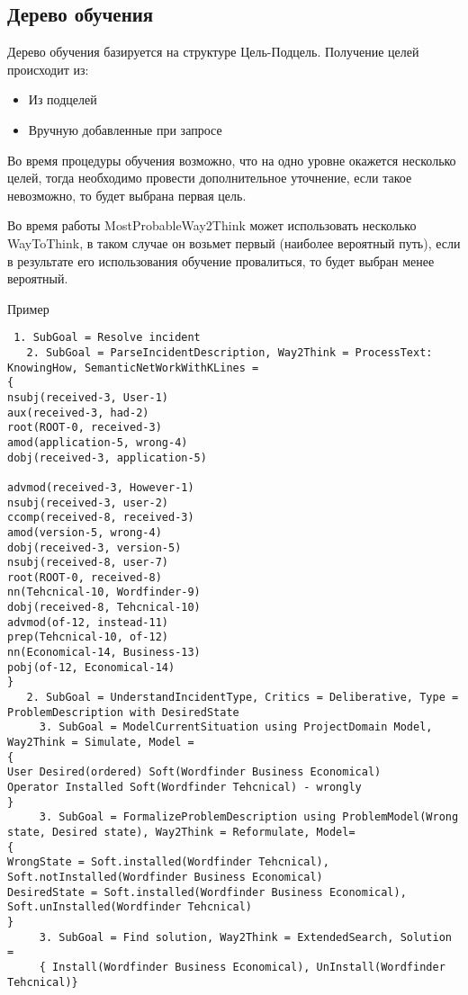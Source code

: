 \subsection{Дерево обучения}
Дерево обучения базируется на структуре Цель-Подцель. Получение целей происходит из:
\begin{itemize}
	\item Из подцелей
	\item Вручную добавленные при запросе
\end{itemize}

Во время процедуры обучения возможно, что на одно уровне окажется несколько целей, тогда необходимо провести дополнительное уточнение, если такое невозможно, то будет выбрана первая цель.


Во время работы MostProbableWay2Think может использовать несколько WayToThink, в таком случае он возьмет первый (наиболее вероятный путь), если в результате его использования обучение провалиться, то будет выбран менее вероятный.

Пример
\begin{lstlisting}
 1. SubGoal = Resolve incident
   2. SubGoal = ParseIncidentDescription, Way2Think = ProcessText: KnowingHow, SemanticNetWorkWithKLines =
{
nsubj(received-3, User-1)
aux(received-3, had-2)
root(ROOT-0, received-3)
amod(application-5, wrong-4)
dobj(received-3, application-5)

advmod(received-3, However-1)
nsubj(received-3, user-2)
ccomp(received-8, received-3)
amod(version-5, wrong-4)
dobj(received-3, version-5)
nsubj(received-8, user-7)
root(ROOT-0, received-8)
nn(Tehcnical-10, Wordfinder-9)
dobj(received-8, Tehcnical-10)
advmod(of-12, instead-11)
prep(Tehcnical-10, of-12)
nn(Economical-14, Business-13)
pobj(of-12, Economical-14)
}
   2. SubGoal = UnderstandIncidentType, Critics = Deliberative, Type = ProblemDescription with DesiredState
     3. SubGoal = ModelCurrentSituation using ProjectDomain Model, Way2Think = Simulate, Model =
{
User Desired(ordered) Soft(Wordfinder Business Economical)
Operator Installed Soft(Wordfinder Tehcnical) - wrongly
}
     3. SubGoal = FormalizeProblemDescription using ProblemModel(Wrong state, Desired state), Way2Think = Reformulate, Model=
{
WrongState = Soft.installed(Wordfinder Tehcnical), Soft.notInstalled(Wordfinder Business Economical)
DesiredState = Soft.installed(Wordfinder Business Economical), Soft.unInstalled(Wordfinder Tehcnical)
}
     3. SubGoal = Find solution, Way2Think = ExtendedSearch, Solution =
     { Install(Wordfinder Business Economical), UnInstall(Wordfinder Tehcnical)}
     
\end{lstlisting}
\clearpage

